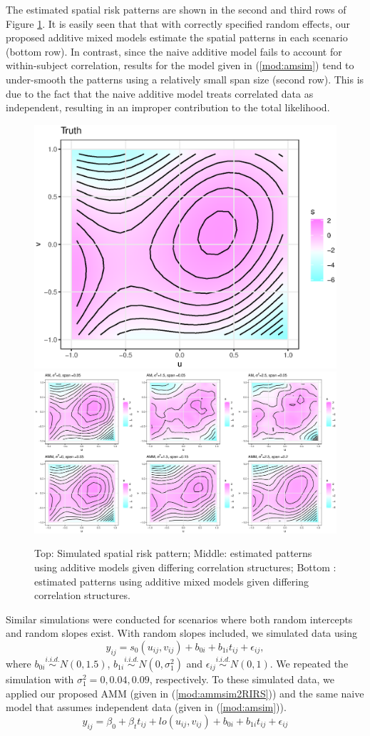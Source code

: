 	The estimated spatial risk patterns are shown in the second and third rows of Figure \ref{f:simplots}. It is easily seen that that with correctly specified random effects, our proposed additive mixed models estimate the spatial patterns in each scenario (bottom row). In contrast, since the naive additive model fails to account for within-subject correlation, results for the model given in (\ref{mod:amsim}) tend to under-smooth the patterns using a relatively small span size (second row). This is due to the fact that the naive additive model treats correlated data as independent, resulting in an improper contribution to the total likelihood. 
	
	\begin{figure}[H]
		\centering
		\includegraphics[width=0.33\linewidth]{Figures/Chap4/WNAR_true.eps}
		\includegraphics[width=\linewidth]{Figures/Chap4/WNAR_ests_h.eps}
		\caption{Top: Simulated spatial risk pattern; Middle: estimated patterns using additive models given differing correlation structures; Bottom : estimated patterns using additive mixed models given differing correlation structures.}
		\label{f:simplots}
	\end{figure}
	
	Similar simulations were conducted for scenarios where both random intercepts and random slopes exist. With random slopes included, we simulated data using 
	\begin{equation}\label{eq:simbothrand}
	y_{ij} = s_0(u_{ij},v_{ij}) + b_{0i} + b_{1i}t_{ij} + \epsilon_{ij},
	\end{equation}
	where $b_{0i} \stackrel{i.i.d.}{\sim} N(0,1.5)$, $b_{1i} \stackrel{i.i.d.}{\sim} N(0,\sigma_1^2)$ and $\epsilon_{ij} \stackrel{i.i.d.}{\sim} N(0,1)$. We repeated the simulation with $\sigma_1^2=0,0.04,0.09$, respectively. To these simulated data, we applied our proposed AMM (given in (\ref{mod:ammsim2RIRS})) and the same naive model that assumes independent data (given in (\ref{mod:amsim})).
	\begin{equation}\label{mod:ammsim2RIRS}
	y_{ij} = \beta_0 + \beta_t t_{ij} + lo(u_{ij},v_{ij}) + b_{0i} + b_{1i}t_{ij}  + \epsilon_{ij}
	\end{equation}
	

